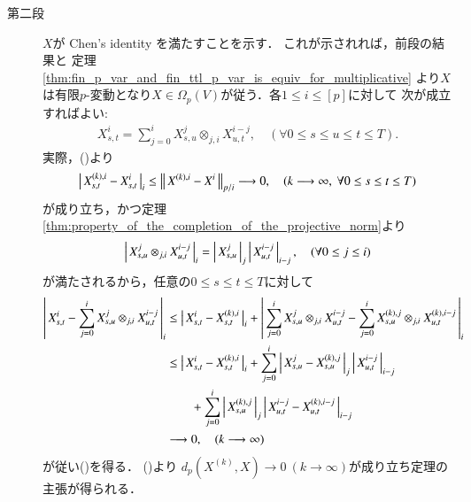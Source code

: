 \begin{prf}
\begin{description}
		\item[第二段] $X$が Chen's identity を満たすことを示す．
			これが示されれば，前段の結果と
			定理\ref{thm:fin_p_var_and_fin_ttl_p_var_is_equiv_for_multiplicative}
			より$X$は有限$p$-変動となり$X \in \Omega_p(V)$が従う．各$1 \leq i \leq [p]$に対して
			次が成立すればよい:
			\begin{align}
				X^i_{s,t} = \sum_{j=0}^i X^j_{s,u} \otimes_{j,i} X^{i-j}_{u,t},
				\quad (\forall 0 \leq s \leq u \leq t \leq T).
				\label{eq:thm_p_rough_path_complete_dist_1}
			\end{align}
			実際，()より
			\begin{align}
				\left|\, X^{(k),i}_{s,t} - X^i_{s,t}\, \right|_{i}
				\leq \left\|\, X^{(k),i} - X^i\, \right\|_{p/i} \longrightarrow 0,
				\quad (k \longrightarrow \infty,\ \forall 0 \leq s \leq t \leq T)
			\end{align}
			が成り立ち，かつ定理\ref{thm:property_of_the_completion_of_the_projective_norm}より
			\begin{align}
				\left|\, X^j_{s,u} \otimes_{j,i} X^{i-j}_{u,t}\, \right|_{i}
				= \left|\, X^j_{s,u}\, \right|_{j} \left|\, X^{i-j}_{u,t}\, \right|_{i-j},
				\quad (\forall 0 \leq j \leq i)
			\end{align}
			が満たされるから，任意の$0 \leq s \leq t \leq T$に対して
			\begin{align}
				\left|\, X^i_{s,t} - \sum_{j=0}^i X^j_{s,u} \otimes_{j,i} X^{i-j}_{u,t}\, \right|_{i}
				&\leq \left|\, X^i_{s,t} - X^{(k),i}_{s,t}\, \right|_{i}
					+ \left|\, \sum_{j=0}^i X^j_{s,u} \otimes_{j,i} X^{i-j}_{u,t} 
					- \sum_{j=0}^i X^{(k),j}_{s,u} \otimes_{j,i} X^{(k),i-j}_{u,t}\, \right|_{i} \\
				&\leq \left|\, X^i_{s,t} - X^{(k),i}_{s,t}\, \right|_{i}
					+ \sum_{j=0}^i \left|\, X^j_{s,u} - X^{(k),j}_{s,u}\, \right|_{j}
						\left|\, X^{i-j}_{u,t}\, \right|_{i-j} \\
					&\qquad + \sum_{j=0}^i \left|\, X^{(k),j}_{s,u}\, \right|_{j}
						\left|\, X^{i-j}_{u,t} - X^{(k),i-j}_{u,t}\, \right|_{i-j} \\
				&\longrightarrow 0,
				\quad (k \longrightarrow \infty)
			\end{align}
			が従い()を得る．
			()より
			$d_p(X^{(k)},X) \longrightarrow 0\ (k \longrightarrow \infty)$が成り立ち定理の主張が得られる．
			\QED
	\end{description}
\end{prf}